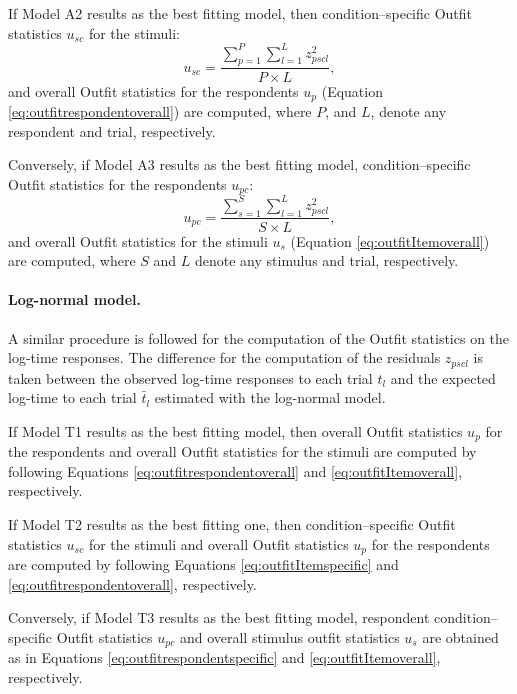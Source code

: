 \documentclass[12pt]{book}
\begin{document}
If Model A2 results as the best fitting model, then condition--specific Outfit statistics $u_{sc}$ for the stimuli: 
\begin{equation}\label{eq:outfitItemspecific}
	u_{sc} = \frac{\displaystyle\sum_{p=1}^{P}\sum_{l=1}^{L}z_{pscl}^2}{P\times L},
\end{equation}
and overall Outfit statistics for the respondents $u_p$ (Equation \ref{eq:outfitrespondentoverall}) are computed, where $P$, and $L$, denote any respondent and trial, respectively.

Conversely, if Model A3 results as the best fitting model, condition--specific Outfit statistics for the respondents $u_{pc}$:
\begin{equation}\label{eq:outfitrespondentspecific}
	u_{pc} = \frac{\displaystyle\sum_{s=1}^{S}\sum_{l=1}^{L}z_{pscl}^2}{S \times L},
\end{equation}
and overall Outfit statistics for the stimuli $u_s$ (Equation \ref{eq:outfitItemoverall}) are computed,  where $S$ and $L$ denote any  stimulus and trial, respectively.

\paragraph{Log-normal model.}
A similar procedure is followed for the computation of the Outfit statistics on the log-time responses. 
The difference for the computation of the residuals $z_{pscl}$ is taken between the observed log-time responses to each trial $t_l$ and the expected log-time to each trial $\bar t_l$ estimated with the log-normal model. 

If Model T1 results as the best fitting model, then overall Outfit statistics $u_p$ for the respondents and overall Outfit statistics for the stimuli are computed by following Equations \ref{eq:outfitrespondentoverall} and \ref{eq:outfitItemoverall}, respectively.

If Model T2 results as the best fitting one, then condition--specific Outfit statistics $u_{sc}$ for the stimuli and overall Outfit statistics $u_p$ for the respondents are computed by following Equations \ref{eq:outfitItemspecific} and \ref{eq:outfitrespondentoverall}, respectively. 


Conversely, if Model T3 results as the best fitting model, respondent condition--specific Outfit statistics $u_{pc}$ and overall stimulus outfit statistics $u_s$ are obtained as in Equations \ref{eq:outfitrespondentspecific} and \ref{eq:outfitItemoverall}, respectively.
\end{document}
